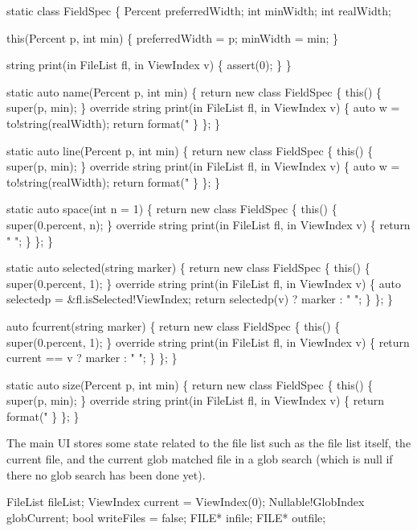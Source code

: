 \nwenddocs{}\endmoddef\nwstartdeflinemarkup\nwenddeflinemarkup
static class FieldSpec
\{
  Percent preferredWidth;
  int     minWidth;
  int     realWidth;

  this(Percent p, int min) \{
    preferredWidth = p;
    minWidth = min;
  \}

  string print(in FileList fl, in ViewIndex v) \{
    assert(0);
  \}
\}

static auto name(Percent p, int min)
\{
  return new class FieldSpec \{
    this() \{ super(p, min); \}
    override string print(in FileList fl, in ViewIndex v)
    \{
      auto w = to!string(realWidth);
      return format("%
    \}
  \};
\}

static auto line(Percent p, int min)
\{
  return new class FieldSpec \{
    this() \{ super(p, min); \}
    override string print(in FileList fl, in ViewIndex v)
    \{
      auto w = to!string(realWidth);
      return format("%
    \}
  \};
\}

static auto space(int n = 1)
\{
  return new class FieldSpec \{
    this() \{ super(0.percent, n); \}
    override string print(in FileList fl, in ViewIndex v)
    \{
      return " ";
    \}
  \};
\}

static auto selected(string marker)
\{
  return new class FieldSpec \{
    this() \{ super(0.percent, 1); \}
    override string print(in FileList fl, in ViewIndex v)
    \{
      auto selectedp = &fl.isSelected!ViewIndex;
      return selectedp(v) ? marker : " ";
    \}
  \};
\}

auto fcurrent(string marker)
\{
  return new class FieldSpec \{
    this() \{ super(0.percent, 1); \}
    override string print(in FileList fl, in ViewIndex v)
    \{
      return current == v ? marker : " ";
    \}
  \};
\}

static auto size(Percent p, int min)
\{
  return new class FieldSpec \{
    this() \{ super(p, min); \}
    override string print(in FileList fl, in ViewIndex v)
    \{
      return format("%
    \}
  \};
\}

\nwendcode{}The main UI stores some state related to the file list such as the
file list itself, the current file, and the current glob matched file
in a glob search (which is null if there no glob search has been done
yet).

\nwenddocs{}\plusendmoddef\nwstartdeflinemarkup\nwenddeflinemarkup
FileList fileList;
ViewIndex current = ViewIndex(0);
Nullable!GlobIndex globCurrent;
bool writeFiles = false;
FILE* infile;
FILE* outfile;


